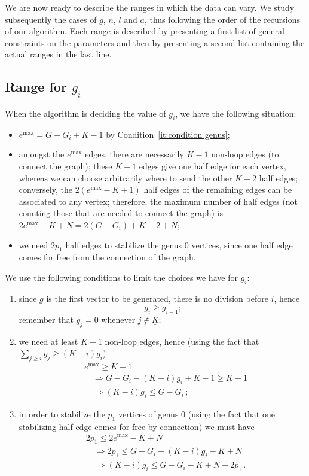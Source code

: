 \documentclass{amsart}
\theoremstyle{plain}
\theoremstyle{definition}
\DeclareMathOperator{\MAX}{max}
\newcommand{\ubar}[1]{\underline{#1}}
\begin{document}
We are now ready to describe the ranges in which the data can vary.
We study subsequently the cases of $g$, $n$, $l$ and $a$, thus
following the order of the recursions of our algorithm. Each range is
described by presenting a first list of general constraints on the
parameters and then by presenting a second list containing the actual
ranges in the last line.


\subsection{Range for $g_i$}

When the algorithm is deciding the value of $g_i$, we have the
following situation:
\begin{itemize}
\item $e^{\MAX} = G - G_i + K - 1$ by Condition~\ref{it:condition
    genus};
\item amongst the $e^{\MAX}$ edges, there are necessarily $K-1$
  non-loop edges (to connect the graph); these $K-1$ edges give one
  half edge for each vertex, whereas we can choose arbitrarily where
  to send the other $K-2$ half edges; conversely, the $2(e^{\MAX} - K
  +1)$ half edges of the remaining edges can be associated to any
  vertex; therefore, the maximum number of half edges (not counting
  those that are needed to connect the graph) is $2e^{\MAX} - K + N =
  2(G - G_i) + K - 2 + N$;
\item we need $2p_1$ half edges to stabilize the genus $0$ vertices,
  since one half edge comes for free from the connection of the graph.
\end{itemize}

We use the following conditions to limit the choices we have for
$g_i$:
\begin{enumerate}
\item since $g$ is the first vector to be generated, there is no
  division before $i$, hence
  \[
  g_i \geq g_{i-1}\text{;}
  \]
  remember that $g_j = 0$ whenever $j \not\in \ubar{K}$;
\item we need at least $K-1$ non-loop edges, hence (using the fact
  that $\sum_{j \geq i} g_j \geq (K-i) g_i$)
  \begin{align*}
    &e^{\MAX} \geq K-1\\
    &\quad\Rightarrow G - G_i - (K-i) g_i + K-1 \geq K-1\\
    &\quad\Rightarrow (K-i)g_i \leq G - G_i\,\text{;}
  \end{align*}
\item in order to stabilize the $p_1$ vertices of genus $0$ (using the
  fact that one stabilizing half edge comes for free by connection) we
  must have
  \begin{align*}
    &2 p_1 \leq 2e^{\MAX} - K + N\\
    &\quad\Rightarrow 2p_1 \leq G - G_i - (K-i)g_i - K + N\\
    &\quad\Rightarrow (K-i)g_i \leq G - G_i - K + N - 2p_1\,\text{.}
  \end{align*}
\end{enumerate}
\end{document}
